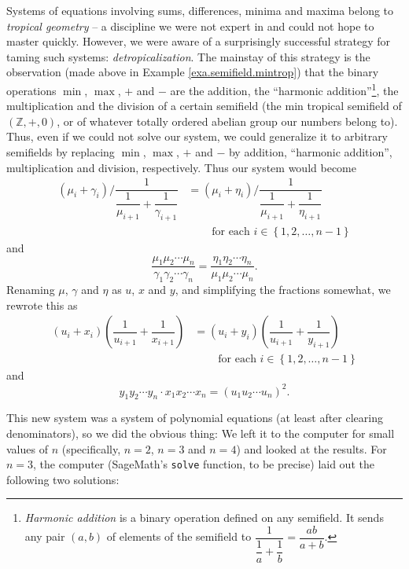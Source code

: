 \documentclass[numbers=enddot,12pt,final,onecolumn,notitlepage]{scrartcl}%
\theoremstyle{definition}
\begin{document}
Systems of equations involving sums, differences, minima and maxima belong to
\textit{tropical geometry} -- a discipline we were not expert in and could not
hope to master quickly. However, we were aware of a surprisingly successful
strategy for taming such systems: \textit{detropicalization}. The mainstay of
this strategy is the observation (made above in Example
\ref{exa.semifield.mintrop}) that the binary operations $\min$, $\max$, $+$
and $-$ are the addition, the \textquotedblleft harmonic
addition\textquotedblright\footnote{\textit{Harmonic addition} is a binary
operation defined on any semifield. It sends any pair $\left(  a,b\right)  $
of elements of the semifield to $\dfrac{1}{\dfrac{1}{a}+\dfrac{1}{b}}%
=\dfrac{ab}{a+b}$.}, the multiplication and the division of a certain
semifield (the min tropical semifield of $\left(  \mathbb{Z},+,0\right)  $, or
of whatever totally ordered abelian group our numbers belong to). Thus, even
if we could not solve our system, we could generalize it to arbitrary
semifields by replacing $\min$, $\max$, $+$ and $-$ by addition,
\textquotedblleft harmonic addition\textquotedblright, multiplication and
division, respectively. Thus our system would become%
\begin{align*}
\left(  \mu_{i}+\gamma_{i}\right)  /\dfrac{1}{\dfrac{1}{\mu_{i+1}}+\dfrac
{1}{\gamma_{i+1}}}  &  =\left(  \mu_{i}+\eta_{i}\right)  /\dfrac{1}{\dfrac
{1}{\mu_{i+1}}+\dfrac{1}{\eta_{i+1}}}\\
&  \ \ \ \ \ \ \ \ \ \ \text{for each }i\in\left\{  1,2,\ldots,n-1\right\}
\end{align*}
and%
\[
\dfrac{\mu_{1}\mu_{2}\cdots\mu_{n}}{\gamma_{1}\gamma_{2}\cdots\gamma_{n}%
}=\dfrac{\eta_{1}\eta_{2}\cdots\eta_{n}}{\mu_{1}\mu_{2}\cdots\mu_{n}}.
\]
Renaming $\mu$, $\gamma$ and $\eta$ as $u$, $x$ and $y$, and simplifying the
fractions somewhat, we rewrote this as%
\begin{align*}
\left(  u_{i}+x_{i}\right)  \left(  \dfrac{1}{u_{i+1}}+\dfrac{1}{x_{i+1}%
}\right)   &  =\left(  u_{i}+y_{i}\right)  \left(  \dfrac{1}{u_{i+1}}%
+\dfrac{1}{y_{i+1}}\right) \\
&  \ \ \ \ \ \ \ \ \ \ \text{for each }i\in\left\{  1,2,\ldots,n-1\right\}
\end{align*}
and%
\[
y_{1}y_{2}\cdots y_{n}\cdot x_{1}x_{2}\cdots x_{n}=\left(  u_{1}u_{2}\cdots
u_{n}\right)  ^{2}.
\]


This new system was a system of polynomial equations (at least after clearing
denominators), so we did the obvious thing: We left it to the computer for
small values of $n$ (specifically, $n=2$, $n=3$ and $n=4$) and looked at the
results. For $n=3$, the computer (SageMath's \texttt{solve} function, to be
precise) laid out the following two solutions:
\end{document}
